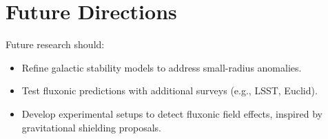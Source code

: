 \documentclass{article}
\begin{document}
\section{Future Directions}
Future research should:
\begin{itemize}
    \item Refine galactic stability models to address small-radius anomalies.
    \item Test fluxonic predictions with additional surveys (e.g., LSST, Euclid).
    \item Develop experimental setups to detect fluxonic field effects, inspired by gravitational shielding proposals.
\end{itemize}
\end{document}
